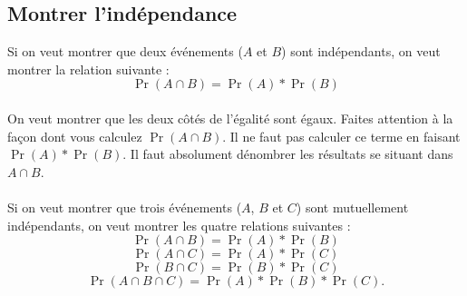 \documentclass[10pt, french]{article}
\begin{document}
\begin{multicols*}{2}
\subsection{Montrer l'indépendance}
\begin{definitionNOHFILL}
Si on veut montrer que deux événements  ($A$ et $B$) sont indépendants, on veut montrer la relation suivante : \\
$$ \Pr(A \cap B) = \Pr(A) * \Pr(B) $$\\
On veut montrer que les deux côtés de l'égalité sont égaux. Faites attention à la façon dont vous calculez $\Pr(A \cap B)$. Il ne faut pas calculer ce terme en faisant $\Pr(A) * \Pr(B)$. Il faut absolument dénombrer les résultats se situant dans $A \cap B$.\\
\\
Si on veut montrer que trois événements ($A$, $B$ et $C$) sont mutuellement indépendants, on veut montrer les quatre relations suivantes : \\
$$\Pr(A \cap B) =  \Pr(A) * \Pr(B)$$
$$\Pr(A \cap C) =  \Pr(A) * \Pr(C)$$
$$\Pr(B \cap C) =  \Pr(B) * \Pr(C)$$
$$\Pr(A \cap B \cap C) =  \Pr(A) * \Pr(B) * \Pr(C).$$
\end{definitionNOHFILL}
\vfill\null
\pagebreak

   
   



\pagebreak

\end{multicols*}
\end{document}
